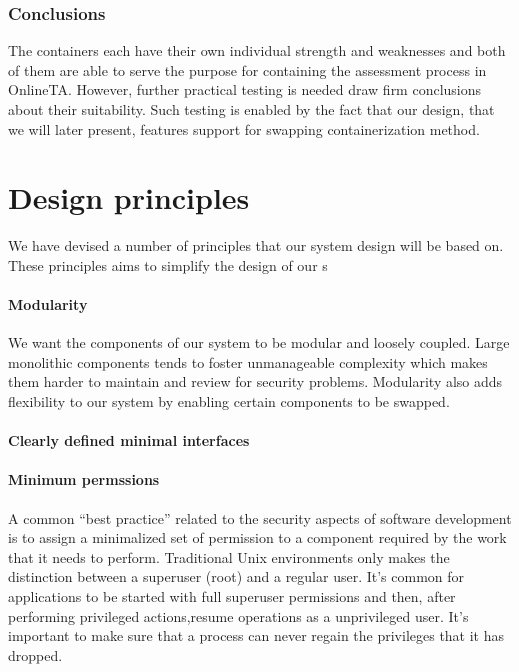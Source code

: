 \subsubsection{Conclusions}
The containers each have their own individual strength and weaknesses
and both of them are able to serve the purpose for containing the
assessment process in OnlineTA. However, further practical testing is
needed draw firm conclusions about their suitability. Such testing is
enabled by the fact that our design, that we will later present,
features support for swapping containerization method.


\section{Design principles}
We have devised a number of principles that our system design will be
based on. These principles aims to simplify the design of our s

\paragraph{Modularity}
We want the components of our system to be modular and loosely
coupled. Large monolithic components tends to foster unmanageable
complexity which makes them harder to maintain and review for security
problems.
Modularity also adds flexibility to our system by enabling certain
components to be swapped.

\paragraph{Clearly defined minimal interfaces}


\paragraph{Minimum permssions}
\label{sec:cap}

A common "`best practice"' related to the security aspects of software
development is to assign a minimalized set of permission to a
component required by the work that it needs to perform. Traditional
Unix environments only makes the distinction between a superuser
(root) and a regular user. It's common for applications to be started
with full superuser permissions and then, after performing privileged
actions,resume operations as a unprivileged user. It's important to
make sure that a process can never regain the privileges that it has
dropped.

